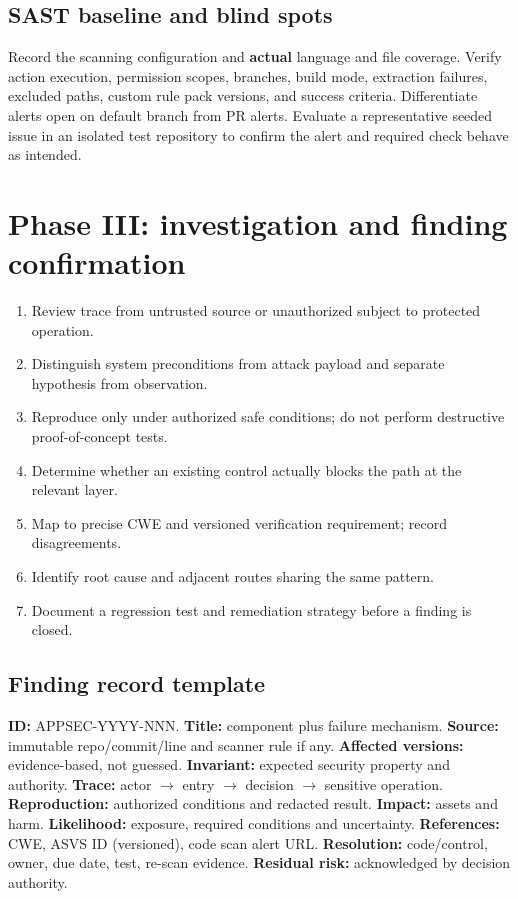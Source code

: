 \documentclass[
  letterpaper,
]{article}
\providecommand{\tightlist}{%
  \setlength{\itemsep}{0pt}\setlength{\parskip}{0pt}}
\begin{document}
\subsection{SAST baseline and blind
spots}\label{sast-baseline-and-blind-spots}

Record the scanning configuration and \textbf{actual} language and file
coverage. Verify action execution, permission scopes, branches, build
mode, extraction failures, excluded paths, custom rule pack versions,
and success criteria. Differentiate alerts open on default branch from
PR alerts. Evaluate a representative seeded issue in an isolated test
repository to confirm the alert and required check behave as intended.

\section{Phase III: investigation and finding
confirmation}\label{phase-iii-investigation-and-finding-confirmation}

\begin{enumerate}
\def\labelenumi{\arabic{enumi}.}
\tightlist
\item
  Review trace from untrusted source or unauthorized subject to
  protected operation.
\item
  Distinguish system preconditions from attack payload and separate
  hypothesis from observation.
\item
  Reproduce only under authorized safe conditions; do not perform
  destructive proof-of-concept tests.
\item
  Determine whether an existing control actually blocks the path at the
  relevant layer.
\item
  Map to precise CWE and versioned verification requirement; record
  disagreements.
\item
  Identify root cause and adjacent routes sharing the same pattern.
\item
  Document a regression test and remediation strategy before a finding
  is closed.
\end{enumerate}

\subsection{Finding record template}\label{finding-record-template}

\textbf{ID:} APPSEC-YYYY-NNN. \textbf{Title:} component plus failure
mechanism. \textbf{Source:} immutable repo/commit/line and scanner rule
if any. \textbf{Affected versions:} evidence-based, not guessed.
\textbf{Invariant:} expected security property and authority.
\textbf{Trace:} actor \(\to\) entry \(\to\) decision \(\to\) sensitive
operation. \textbf{Reproduction:} authorized conditions and redacted
result. \textbf{Impact:} assets and harm. \textbf{Likelihood:} exposure,
required conditions and uncertainty. \textbf{References:} CWE, ASVS ID
(versioned), code scan alert URL. \textbf{Resolution:} code/control,
owner, due date, test, re-scan evidence. \textbf{Residual risk:}
acknowledged by decision authority.
\end{document}
